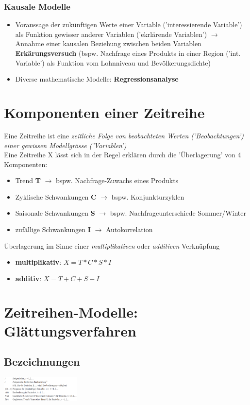 \documentclass{report}
\newenvironment{Figure}
	{\par\medskip\noindent\minipage{\linewidth}}
	{\endminipage\par\medskip}
\theoremstyle{definition}
\theoremstyle{example}
\begin{document}
      \subsubsection{Kausale Modelle}
   \begin{itemize}
      \item Voraussage der zukünftigen Werte einer Variable ('interessierende Variable') als Funktion gewisser anderer Variablen ('ekrlärende Variablen') $\rightarrow$ Annahme einer kausalen Beziehung zwischen beiden Variablen \textbf{Erkärungsversuch} (bspw. Nachfrage eines Produkts in einer Region ('int. Variable') als Funktion vom Lohnniveau und Bevölkerungsdichte)
      \item Diverse mathematische Modelle: \textbf{Regressionsanalyse}
   \end{itemize}


\section{Komponenten einer Zeitreihe}
Eine Zeitreihe ist eine \textit{zeitliche Folge von beobachteten Werten ('Beobachtungen') einer gewissen Modellgrösse ('Variablen')}\\
Eine Zeitreihe X lässt sich in der Regel erklären durch die 'Überlagerung' von 4 Komponenten:
\begin{itemize}
   \item Trend \textbf{T} $\rightarrow$ bspw. Nachfrage-Zuwachs eines Produkts
   \item Zyklische Schwankungen \textbf{C} $\rightarrow$ bspw. Konjunkturzyklen
   \item Saisonale Schwankungen \textbf{S} $\rightarrow$ bspw. Nachfrageunterschiede Sommer/Winter
   \item zufällige Schwankungen \textbf{I} $\rightarrow$ Autokorrelation
\end{itemize}
Überlagerung im Sinne einer \textit{multiplikativen} oder \textit{additiven} Verknüpfung
\begin{itemize}
   \item \textbf{multiplikativ}: $X = T*C*S*I$
   \item \textbf{additiv}: $X = T+C+S+I$
\end{itemize}

\section{Zeitreihen-Modelle: Glättungsverfahren}
   \subsection{Bezeichnungen}
\begin{Figure}
\centering
\includegraphics[width=150px]{img/GlaettungsverfahrenBezeichnungen.png}
	\label{fig:Überblick der Bezeichnungen eines Glättungsverfahren}
\end{Figure}
\end{document}
